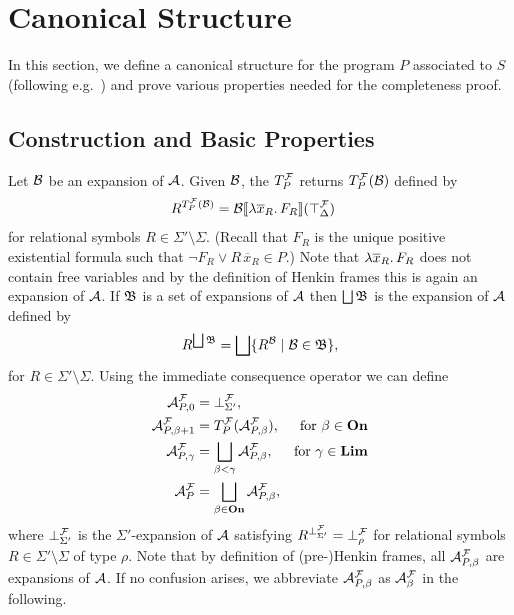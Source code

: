\documentclass[a4paper,twoside,notitlepage,openright,11pt]{report}
\begin{document}
\section{Canonical Structure}
\label{sec:canmod}
In this section, we define a canonical structure for the program $P$ associated to $S$ (following e.g.\ \cite{CHRW13}) and prove various properties needed for the completeness proof.
\subsection{Construction and Basic Properties}
Let $\mathcal B$ be an expansion of $\mathcal A$. Given $\mathcal B$, the  $T^\mathcal F_P$ returns $T^\mathcal F_P(\mathcal B)$ defined by
\begin{align*}
  R^{T^\mathcal F_P(\mathcal B)}&={\mathcal B}\llbracket\lambda\overline x_R\ldotp F_R\rrbracket(\top_\Delta^\mathcal F)
\end{align*}
for relational symbols $R\in\Sigma'\setminus\Sigma$. (Recall that $F_R$ is the unique positive existential formula such that $\neg F_R\lor R\,\overline x_R\in P$.) Note that $\lambda\overline x_R\ldotp F_R$ does not contain free variables and by the definition of Henkin frames this is again an expansion of $\mathcal A$.
If $\mathfrak B$ is a set of expansions of $\mathcal A$ then $\bigsqcup\mathfrak B$ is the expansion of $\mathcal A$ defined by
\begin{align*}
  R^{\bigsqcup\mathfrak B}=\bigsqcup\{R^\mathcal B\mid\mathcal B\in\mathfrak B\},
\end{align*}
for $R\in\Sigma'\setminus\Sigma$.
Using the immediate consequence operator we can define
\begin{align*}
  \mathcal A^\mathcal F_{P,0}&=\bot^\mathcal F_{\Sigma'},\\
  \mathcal A^\mathcal F_{P,\beta+1}&=T^\mathcal F_P(\mathcal A^\mathcal F_{P,\beta}),&\text{for }\beta\in\operatorname{\mathbf{On}}\\
  \mathcal A^\mathcal F_{P,\gamma}&=\bigsqcup_{\beta<\gamma}\mathcal A^\mathcal F_{P,\beta},&\text{for }\gamma\in\operatorname{\mathbf{Lim}}\\
  \mathcal A^\mathcal F_P&=\bigsqcup_{\beta\in\operatorname{\mathbf{On}}}\mathcal A^\mathcal F_{P,\beta},
\end{align*}
where $\bot^\mathcal F_{\Sigma'}$ is the $\Sigma'$-expansion of $\mathcal A$ satisfying $R^{\bot^\mathcal F_{\Sigma'}}=\bot^\mathcal F_\rho$ for relational symbols $R\in\Sigma'\setminus\Sigma$ of type $\rho$. Note that by definition of (pre-)Henkin frames, all $\mathcal A^\mathcal F_{P,\beta}$ are expansions of $\mathcal A$. If no confusion arises, we abbreviate $\mathcal A^\mathcal F_{P,\beta}$ as $\mathcal A^\mathcal F_\beta$ in the following.
\end{document}
